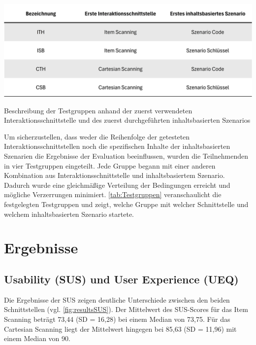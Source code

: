 \begin{table}
    \centering
    \includegraphics[scale=0.9]{images/Tabelle-Evaluationsgruppen.png}
    \caption{Beschreibung der Testgruppen anhand der zuerst verwendeten Interaktionsschnittstelle und des zuerst durchgeführten inhaltsbasierten Szenarios}
    \label{tab:Testgruppen}
\end{table}

Um sicherzustellen, dass weder die Reihenfolge der getesteten Interaktionsschnittstellen noch die spezifischen Inhalte der inhaltsbasierten Szenarien die Ergebnisse der Evaluation beeinflussen, wurden die Teilnehmenden in vier Testgruppen eingeteilt. Jede Gruppe begann mit einer anderen Kombination aus Interaktionsschnittstelle und inhaltsbasiertem Szenario. Dadurch wurde eine gleichmäßige Verteilung der Bedingungen erreicht und mögliche Verzerrungen minimiert. \autoref{tab:Testgruppen} veranschaulicht die festgelegten Testgruppen und zeigt, welche Gruppe mit welcher Schnittstelle und welchem inhaltsbasierten Szenario startete. 

\section{Ergebnisse}

\subsection{Usability (SUS) und User Experience (UEQ)}

Die Ergebnisse der SUS zeigen deutliche Unterschiede zwischen den beiden Schnittstellen (vgl. \autoref{fig:resultsSUS}). Der Mittelwert des SUS-Scores für das Item Scanning beträgt 73,44 (SD = 16,28) bei einem Median von 73,75. Für das Cartesian Scanning liegt der Mittelwert hingegen bei 85,63 (SD = 11,96) mit einem Median von 90. 

